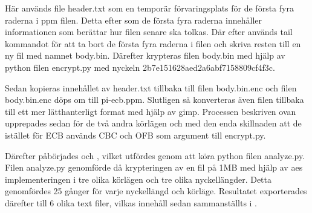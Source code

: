 Här används file header.txt som en temporär förvaringsplats för de första fyra raderna i \gls{ppm} filen. Detta
efter som de första fyra raderna innehåller informationen som berättar hur filen senare ska tolkas. Där efter används
tail kommandot för att ta bort de första fyra raderna i filen och skriva resten till en ny fil med namnet body.bin.
Därefter krypteras filen body.bin med hjälp av \gls{python} filen encrypt.py med nyckeln 2b7e151628aed2a6abf7158809cf4f3c.

Sedan kopieras innehållet av header.txt tillbaka till filen body.bin.enc och filen body.bin.enc döps om till pi-ecb.ppm.
Slutligen så konverteras även filen tillbaka till ett mer lätthanterligt format med hjälp av \gls{gimp}.
Processen beskriven ovan upprepades sedan för de två andra körlägen  och  med
den enda skillnaden att de istället för ECB används CBC och OFB som argument till encrypt.py.

Därefter påbörjades  och , vilket utfördes genom att köra
\gls{python} filen analyze.py. Filen analyze.py genomförde då krypteringen av en fil på 1MB med hjälp av \acrshort{aes}
implementeringen i tre olika körlägen och tre olika nyckellängder. Detta genomfördes 25 gånger för varje nyckellängd och
körläge. Resultatet exporterades därefter till 6 olika text filer, vilkas innehåll sedan sammanställts i .